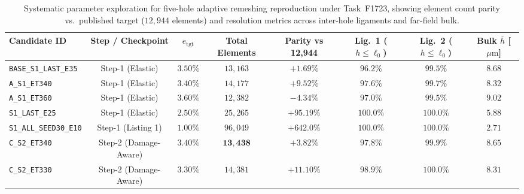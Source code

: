 \begin{table}[htbp]
\centering
\caption{Systematic parameter exploration for five-hole adaptive remeshing reproduction under Task~F1723, showing element count parity vs.\ published target ($12{,}944$ elements) and resolution metrics across inter-hole ligaments and far-field bulk.}
\label{tab:f1723_parameter_matrix}
\footnotesize
\begin{tabular}{l c c c c c c c}
\toprule
\textbf{Candidate ID} & \textbf{Step / Checkpoint} & $e_{\mathrm{tgt}}$ & \textbf{Total Elements} & \textbf{Parity vs 12,944} & \textbf{Lig.~1 ($h \le \ell_0$)} & \textbf{Lig.~2 ($h \le \ell_0$)} & \textbf{Bulk $\bar{h}$ [$\mu\mathrm{m}$]} \\
\midrule
\texttt{BASE\_S1\_LAST\_E35} & Step-1 (Elastic) & $3.50\%$ & $13{,}163$ & $+1.69\%$ & $96.2\%$ & $99.5\%$ & $8.68$ \\
\texttt{A\_S1\_ET340}        & Step-1 (Elastic) & $3.40\%$ & $14{,}177$ & $+9.52\%$ & $97.6\%$ & $99.7\%$ & $8.32$ \\
\texttt{A\_S1\_ET360}        & Step-1 (Elastic) & $3.60\%$ & $12{,}382$ & $-4.34\%$ & $97.0\%$ & $99.5\%$ & $9.02$ \\
\texttt{S1\_LAST\_E25}       & Step-1 (Elastic) & $2.50\%$ & $25{,}265$ & $+95.19\%$ & $100.0\%$ & $100.0\%$ & $5.88$ \\
\texttt{S1\_ALL\_SEED30\_E10}& Step-1 (Listing 1)& $1.00\%$ & $96{,}049$ & $+642.0\%$ & $100.0\%$ & $100.0\%$ & $2.71$ \\
\midrule
\texttt{C\_S2\_ET340}        & Step-2 (Damage-Aware) & $3.40\%$ & $\mathbf{13{,}438}$ & $\mathbf{+3.82\%}$ & $\mathbf{97.8\%}$ & $\mathbf{99.9\%}$ & $\mathbf{8.65}$ \\
\texttt{C\_S2\_ET330}        & Step-2 (Damage-Aware) & $3.30\%$ & $14{,}381$ & $+11.10\%$ & $98.9\%$ & $100.0\%$ & $8.31$ \\
\bottomrule
\end{tabular}
\end{table}

